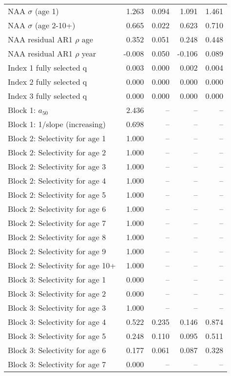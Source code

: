 \documentclass[
]{article}
\begin{document}
\begin{landscape}
\begin{longtable}[t]{lrrrr}
\endfoot
\bottomrule
\endlastfoot
NAA $\sigma$ (age 1) & 1.263 & 0.094 & 1.091 & 1.461\\
NAA $\sigma$ (age 2-10+) & 0.665 & 0.022 & 0.623 & 0.710\\
NAA residual AR1 $\rho$ age & 0.352 & 0.051 & 0.248 & 0.448\\
NAA residual AR1 $\rho$ year & -0.008 & 0.050 & -0.106 & 0.089\\
Index 1 fully selected q & 0.003 & 0.000 & 0.002 & 0.004\\
\addlinespace
Index 2 fully selected q & 0.000 & 0.000 & 0.000 & 0.000\\
Index 3 fully selected q & 0.000 & 0.000 & 0.000 & 0.000\\
Block 1: $a_{50}$ & 2.436 & -- & -- & --\\
Block 1: 1/slope (increasing) & 0.698 & -- & -- & --\\
Block 2: Selectivity for age 1 & 1.000 & -- & -- & --\\
\addlinespace
Block 2: Selectivity for age 2 & 1.000 & -- & -- & --\\
Block 2: Selectivity for age 3 & 1.000 & -- & -- & --\\
Block 2: Selectivity for age 4 & 1.000 & -- & -- & --\\
Block 2: Selectivity for age 5 & 1.000 & -- & -- & --\\
Block 2: Selectivity for age 6 & 1.000 & -- & -- & --\\
\addlinespace
Block 2: Selectivity for age 7 & 1.000 & -- & -- & --\\
Block 2: Selectivity for age 8 & 1.000 & -- & -- & --\\
Block 2: Selectivity for age 9 & 1.000 & -- & -- & --\\
Block 2: Selectivity for age 10+ & 1.000 & -- & -- & --\\
Block 3: Selectivity for age 1 & 0.000 & -- & -- & --\\
\addlinespace
Block 3: Selectivity for age 2 & 0.000 & -- & -- & --\\
Block 3: Selectivity for age 3 & 1.000 & -- & -- & --\\
Block 3: Selectivity for age 4 & 0.522 & 0.235 & 0.146 & 0.874\\
Block 3: Selectivity for age 5 & 0.248 & 0.110 & 0.095 & 0.511\\
Block 3: Selectivity for age 6 & 0.177 & 0.061 & 0.087 & 0.328\\
\addlinespace
Block 3: Selectivity for age 7 & 0.000 & -- & -- & --\\

\end{longtable}
\end{landscape}
\end{document}
